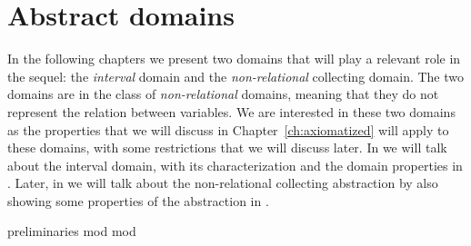 \chapter{Abstract domains}\label{ch:abstractdomains}


In the following chapters we present two domains that will play a
relevant role in the sequel: the \emph{interval} domain and the
\emph{non-relational} collecting domain. The two domains are in the
class of \emph{non-relational} domains, meaning that they do not
represent the relation between variables. We are interested in these
two domains as the properties that we will discuss in
Chapter~\ref{ch:axiomatized} will apply to these domains, with some
restrictions that we will discuss later. In  we
will talk about the interval domain, with its characterization and the
domain properties in .  Later, in
 we will talk about the non-relational
collecting abstraction by also showing some properties of the
abstraction in .

{preliminaries}
{mod}
{mod}

